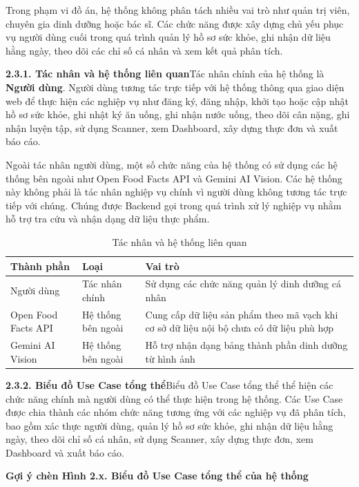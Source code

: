 Trong phạm vi đồ án, hệ thống không phân tách nhiều vai trò như quản trị viên, chuyên gia dinh dưỡng hoặc bác sĩ. Các chức năng được xây dựng chủ yếu phục vụ người dùng cuối trong quá trình quản lý hồ sơ sức khỏe, ghi nhận dữ liệu hằng ngày, theo dõi các chỉ số cá nhân và xem kết quả phân tích.

\textbf{2.3.1. Tác nhân và hệ thống liên quan}Tác nhân chính của hệ thống là \textbf{Người dùng}. Người dùng tương tác trực tiếp với hệ thống thông qua giao diện web để thực hiện các nghiệp vụ như đăng ký, đăng nhập, khởi tạo hoặc cập nhật hồ sơ sức khỏe, ghi nhật ký ăn uống, ghi nhận nước uống, theo dõi cân nặng, ghi nhận luyện tập, sử dụng Scanner, xem Dashboard, xây dựng thực đơn và xuất báo cáo.

Ngoài tác nhân người dùng, một số chức năng của hệ thống có sử dụng các hệ thống bên ngoài như Open Food Facts API và Gemini AI Vision. Các hệ thống này không phải là tác nhân nghiệp vụ chính vì người dùng không tương tác trực tiếp với chúng. Chúng được Backend gọi trong quá trình xử lý nghiệp vụ nhằm hỗ trợ tra cứu và nhận dạng dữ liệu thực phẩm.

\begin{table}[H]
\centering
\caption{Tác nhân và hệ thống liên quan}
\begin{tabular}{|p{4cm}|p{5.5cm}|p{5.5cm}|}
\hline
\textbf{Thành phần} & \textbf{Loại} & \textbf{Vai trò} \\ \hline
Người dùng & Tác nhân chính & Sử dụng các chức năng quản lý dinh dưỡng cá nhân \\ \hline
Open Food Facts API & Hệ thống bên ngoài & Cung cấp dữ liệu sản phẩm theo mã vạch khi cơ sở dữ liệu nội bộ chưa có dữ liệu phù hợp \\ \hline
Gemini AI Vision & Hệ thống bên ngoài & Hỗ trợ nhận dạng bảng thành phần dinh dưỡng từ hình ảnh \\ \hline
\end{tabular}
\end{table}

\textbf{2.3.2. Biểu đồ Use Case tổng thể}Biểu đồ Use Case tổng thể thể hiện các chức năng chính mà người dùng có thể thực hiện trong hệ thống. Các Use Case được chia thành các nhóm chức năng tương ứng với các nghiệp vụ đã phân tích, bao gồm xác thực người dùng, quản lý hồ sơ sức khỏe, ghi nhận dữ liệu hằng ngày, theo dõi chỉ số cá nhân, sử dụng Scanner, xây dựng thực đơn, xem Dashboard và xuất báo cáo.

\textbf{Gợi ý chèn Hình 2.x. Biểu đồ Use Case tổng thể của hệ thống}

